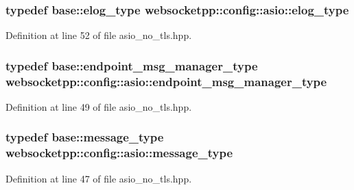 \hypertarget{structwebsocketpp_1_1config_1_1asio_a67f2a92d70443a37f25ffbc08a6a9c3d}{}
\subsubsection[{elog\+\_\+type}]{\setlength{\rightskip}{0pt plus 5cm}typedef {\bf base\+::elog\+\_\+type} {\bf websocketpp\+::config\+::asio\+::elog\+\_\+type}}\label{structwebsocketpp_1_1config_1_1asio_a67f2a92d70443a37f25ffbc08a6a9c3d}


Definition at line 52 of file asio\+\_\+no\+\_\+tls.\+hpp.

\hypertarget{structwebsocketpp_1_1config_1_1asio_a5cc654513cddc3bc7d15ed37b2427150}{}
\subsubsection[{endpoint\+\_\+msg\+\_\+manager\+\_\+type}]{\setlength{\rightskip}{0pt plus 5cm}typedef {\bf base\+::endpoint\+\_\+msg\+\_\+manager\+\_\+type} {\bf websocketpp\+::config\+::asio\+::endpoint\+\_\+msg\+\_\+manager\+\_\+type}}\label{structwebsocketpp_1_1config_1_1asio_a5cc654513cddc3bc7d15ed37b2427150}


Definition at line 49 of file asio\+\_\+no\+\_\+tls.\+hpp.

\hypertarget{structwebsocketpp_1_1config_1_1asio_a89136a9c3a37041226d8d2aaea90fdb1}{}
\subsubsection[{message\+\_\+type}]{\setlength{\rightskip}{0pt plus 5cm}typedef {\bf base\+::message\+\_\+type} {\bf websocketpp\+::config\+::asio\+::message\+\_\+type}}\label{structwebsocketpp_1_1config_1_1asio_a89136a9c3a37041226d8d2aaea90fdb1}


Definition at line 47 of file asio\+\_\+no\+\_\+tls.\+hpp.

